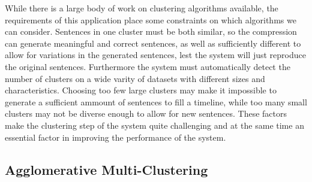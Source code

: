 \documentclass[a4paper,BCOR=10mm]{report}
\begin{document}
While there is a large body of work on clustering algorithms available, the requirements of this application place some constraints on which algorithms we can consider. Sentences in one cluster must be both similar, so the compression can generate meaningful and correct sentences, as well as sufficiently different to allow for variations in the generated sentences, lest the system will just reproduce the original sentences.
Furthermore the system must automatically detect the number of clusters on a wide varity of datasets with different sizes and characteristics.
Choosing too few large clusters may make it impossible to generate a sufficient ammount of sentences to fill a timeline, while too many small clusters may not be diverse enough to allow for new sentences.
These factors make the clustering step of the system quite challenging and at the same time an essential factor in improving the performance of the system.

%
%

\subsection{Agglomerative Multi-Clustering}
\end{document}
